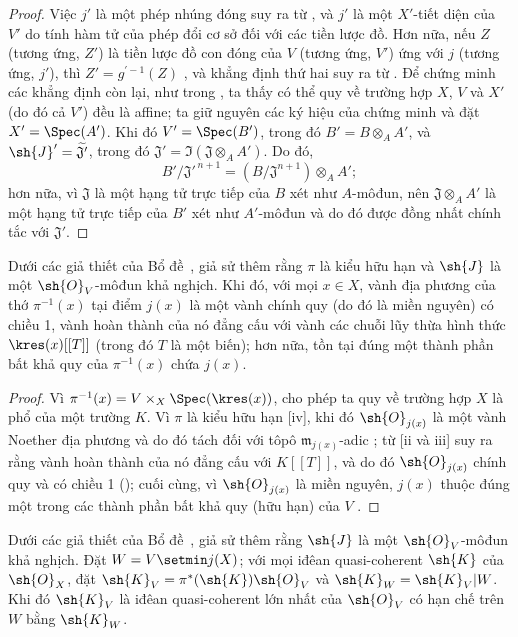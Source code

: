 \documentclass[oneside,10pt]{amsart}
\let\EGAOriginalLabel\label
\renewcommand{\label}[1]{\phantomsection\EGAOriginalLabel{#1}}
\begin{document}
\begin{proof}
Việc $j'$ là một phép nhúng đóng suy ra từ , và $j'$ là một $X'$-tiết diện của $V'$ do tính hàm tử của phép đổi cơ sở đối với các tiền lược đồ.
Hơn nữa, nếu $Z$ (tương ứng, $Z'$) là tiền lược đồ con đóng của $V$ (tương ứng, $V'$) ứng với $j$ (tương ứng, $j'$), thì $Z'=g^{'-1}(Z)$ , và khẳng định thứ hai suy ra từ .
Để chứng minh các khẳng định còn lại, như trong , ta thấy có thể quy về trường hợp $X$, $V$ và $X'$ (do đó cả $V'$) đều là affine;
ta giữ nguyên các ký hiệu của chứng minh  và đặt $X'=\Spec(A')$.
Khi đó $V'=\Spec(B')$, trong đó $B'=B\otimes_A A'$, và $\sh{J}'=\widetilde{\mathfrak{J}'}$, trong đó $\mathfrak{J}'=\Im(\mathfrak{J}\otimes_A A')$.
Do đó,
\[
  B'/\mathfrak{J}'^{\,n+1}
  =(B/\mathfrak{J}^{n+1})\otimes_A A';
\]
hơn nữa, vì $\mathfrak{J}$ là một hạng tử trực tiếp của $B$ xét như $A$-môđun, nên $\mathfrak{J}\otimes_A A'$ là một hạng tử trực tiếp của $B'$ xét như $A'$-môđun và do đó được đồng nhất chính tắc với $\mathfrak{J}'$.
\end{proof}

\begin{corollary}[8.10.3]
\label{II.8.10.3}
Dưới các giả thiết của Bổ đề~, giả sử thêm rằng $\pi$ là kiểu hữu hạn và $\sh{J}$ là một $\sh{O}_V$-môđun khả nghịch.
Khi đó, với mọi $x\in X$, vành địa phương của thớ $\pi^{-1}(x)$ tại điểm $j(x)$ là một vành chính quy (do đó là miền nguyên) có chiều 1, vành hoàn thành của nó đẳng cấu với vành các chuỗi lũy thừa hình thức $\kres(x)[[T]]$ (trong đó $T$ là một biến);
hơn nữa, tồn tại đúng một thành phần bất khả quy của $\pi^{-1}(x)$ chứa $j(x)$.
\end{corollary}

\begin{proof}
Vì $\pi^{-1}(x)=V\times_X\Spec(\kres(x))$,  cho phép ta quy về trường hợp $X$ là phổ của một trường $K$.
Vì $\pi$ là kiểu hữu hạn [iv], khi đó $\sh{O}_{j(x)}$ là một vành Noether địa phương và do đó tách đối với tôpô $\mathfrak{m}_{j(x)}$-adic ;
từ [ii và iii] suy ra rằng vành hoàn thành của nó đẳng cấu với $K[[T]]$, và do đó $\sh{O}_{j(x)}$ chính quy và có chiều 1 (\cite[p.~17-01, th.~1]{I-1});
cuối cùng, vì $\sh{O}_{j(x)}$ là miền nguyên, $j(x)$ thuộc đúng một trong các thành phần bất khả quy (hữu hạn) của $V$ .
\end{proof}

\begin{corollary}[8.10.4]
\label{II.8.10.4}
Dưới các giả thiết của Bổ đề~, giả sử thêm rằng $\sh{J}$ là một $\sh{O}_V$-môđun khả nghịch.
Đặt $W=V\setmin j(X)$;
với mọi iđêan quasi-coherent $\sh{K}$ của $\sh{O}_X$, đặt $\sh{K}_V=\pi^*(\sh{K})\sh{O}_V$ và $\sh{K}_W=\sh{K}_V|W$.
Khi đó $\sh{K}_V$ là iđêan quasi-coherent lớn nhất của $\sh{O}_V$ có hạn chế trên $W$ bằng $\sh{K}_W$.
\end{corollary}
\end{document}
